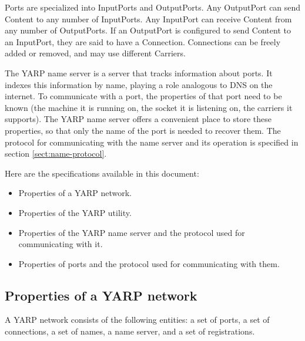 \documentclass[a4]{article}
\begin{document}
Ports are specialized into InputPorts and OutputPorts.
Any OutputPort can send Content to any number of InputPorts.  Any
InputPort can receive Content from any number of OutputPorts.  If an
OutputPort is configured to send Content to an InputPort, they are
said to have a Connection.  Connections can be freely added or 
removed, and may use different Carriers.

The YARP name server is a server that tracks information about ports.
It indexes this information by name, playing a role analogous to
DNS on the internet.
%
To communicate with a port, the properties of that port need to be
known (the machine it is running on, the socket it is listening on,
the carriers it supports).  The YARP name server offers a convenient
place to store these properties, so that only the name of the port is
needed to recover them.
%
The protocol for communicating with the name server
and its operation is specified in section \ref{sect:name-protocol}.

Here are the specifications available in this document:
%
\begin{itemize}

\item Properties of a YARP network.

\item Properties of the YARP utility.

\item Properties of the YARP name server and the protocol used 
for communicating with it.

\item Properties of ports and the protocol used
for communicating with them.

\end{itemize}


\subsection{Properties of a YARP network}

A YARP network consists of the following entities: a set of
ports, a set of connections, a set of names, a name server, and a set
of registrations.
\end{document}
